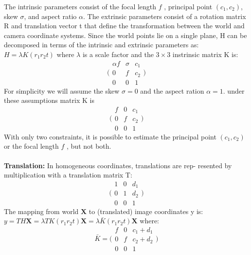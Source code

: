 \documentclass[10pt,a4paper]{book}
\begin{document}
The intrinsic parameters consist of the focal length $f$ , principal point $(c_1 , c_2)$, skew $\sigma$, and aspect ratio $\alpha$. The extrinsic parameters consist of a rotation matrix R and translation vector t that define the transformation between the world and camera coordinate systems. Since the
world points lie on a single plane, H can be decomposed in terms of the intrinsic and extrinsic parameters as: $ H = \lambda K (r_1 r_2 t)$ where $\lambda$ is a scale factor and the $3 \times 3$ instrinsic matrix K is:
$$
\Bigg (
\begin{array}{ccc}
\alpha f & \sigma & c_1 \\ 
0 & f & c_2 \\ 
0 & 0 & 1
\end{array} 
\Bigg )
$$
For simplicity we will assume the skew $\sigma = 0$ and the aspect ration $\alpha=1$. under these assumptions matrix K is 
$$
\Bigg (
\begin{array}{ccc}
f & 0 & c_1 \\ 
0 & f & c_2 \\ 
0 & 0 & 1
\end{array} 
\Bigg )
$$
With only two constraints, it is possible to estimate the principal point $(c_1 , c_2)$ or the focal length $f$ , but not both.\\\\
\textbf{Translation:} In homogeneous coordinates, translations are rep-
resented by multiplication with a translation matrix T:
$$
\Bigg (
\begin{array}{ccc}
1 & 0 & d_1 \\ 
0 & 1 & d_2 \\ 
0 & 0 & 1
\end{array} 
\Bigg )
$$
The mapping from world $\textbf{X}$ to (translated) image coordinates y is: \\
$y=TH\textbf{X} = \lambda T K  (r_1 r_2 t)\textbf{X} = \lambda  \bar K  (r_1 r_2 t)\textbf{X}$ where:
$$ \bar K =
\Bigg (
\begin{array}{ccc}
f & 0 & c_1+d_1 \\ 
0 & f & c_2+d_2 \\ 
0 & 0 & 1
\end{array} 
\Bigg )
$$
\end{document}
